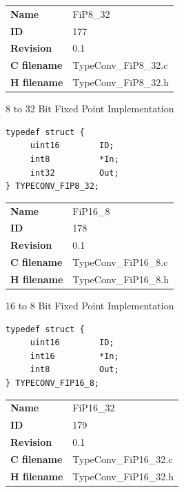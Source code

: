 \ifdefined \AddTestReports
{}
\fi
{}
\nopagebreak[0]
\begin{tabular}{l l}
\textbf{Name} & FiP8\_32 \tabularnewline
\textbf{ID} & 177 \tabularnewline
\textbf{Revision} & 0.1 \tabularnewline
\textbf{C filename} & TypeConv\_FiP8\_32.c \tabularnewline
\textbf{H filename} & TypeConv\_FiP8\_32.h \tabularnewline
\end{tabular}
\vspace{1ex}

8 to 32 Bit Fixed Point Implementation

\begin{lstlisting}
typedef struct {
     uint16        ID;
     int8          *In;
     int32         Out;
} TYPECONV_FIP8_32;
\end{lstlisting}

\ifdefined \AddTestReports
{}
\fi
{}
\nopagebreak[0]
\begin{tabular}{l l}
\textbf{Name} & FiP16\_8 \tabularnewline
\textbf{ID} & 178 \tabularnewline
\textbf{Revision} & 0.1 \tabularnewline
\textbf{C filename} & TypeConv\_FiP16\_8.c \tabularnewline
\textbf{H filename} & TypeConv\_FiP16\_8.h \tabularnewline
\end{tabular}
\vspace{1ex}

16 to 8 Bit Fixed Point Implementation

\begin{lstlisting}
typedef struct {
     uint16        ID;
     int16         *In;
     int8          Out;
} TYPECONV_FIP16_8;
\end{lstlisting}

\ifdefined \AddTestReports
{}
\fi
{}
\nopagebreak[0]
\begin{tabular}{l l}
\textbf{Name} & FiP16\_32 \tabularnewline
\textbf{ID} & 179 \tabularnewline
\textbf{Revision} & 0.1 \tabularnewline
\textbf{C filename} & TypeConv\_FiP16\_32.c \tabularnewline
\textbf{H filename} & TypeConv\_FiP16\_32.h \tabularnewline
\end{tabular}
\vspace{1ex}

